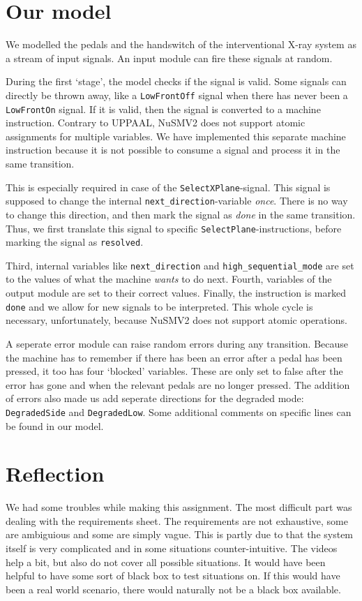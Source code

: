 \documentclass[a4paper,10pt]{article}
\begin{document}
	\section{Our model}
	We modelled the pedals and the handswitch of the interventional X-ray system as a stream of input signals.
	An input module can fire these signals at random.
	
	During the first `stage', the model checks if the signal is valid.
	Some signals can directly be thrown away, like a \texttt{LowFrontOff} signal when there has never been a \texttt{LowFrontOn} signal.
	If it is valid, then the signal is converted to a machine instruction.
	Contrary to UPPAAL, NuSMV2 does not support atomic assignments for multiple variables.
	We have implemented this separate machine instruction because it is not possible to consume a signal and process it in the same transition.
	
	This is especially required in case of the \texttt{SelectXPlane}-signal.
	This signal is supposed to change the internal \texttt{next\_direction}-variable \emph{once}.
	There is no way to change this direction, and then mark the signal as \emph{done} in the same transition.
	Thus, we first translate this signal to specific \texttt{SelectPlane}-instructions, before marking the signal as \texttt{resolved}.

	Third, internal variables like \texttt{next\_direction} and \texttt{high\_sequential\_mode} are set to the values of what the machine \emph{wants} to do next.
	Fourth, variables of the output module are set to their correct values.
	Finally, the instruction is marked \texttt{done} and we allow for new signals to be interpreted.
	This whole cycle is necessary, unfortunately, because NuSMV2 does not support atomic operations.
	
	A seperate error module can raise random errors during any transition.
	Because the machine has to remember if there has been an error after a pedal has been pressed, it too has four `blocked' variables.
	These are only set to false after the error has gone and when the relevant pedals are no longer pressed.
	The addition of errors also made us add seperate directions for the degraded mode: \texttt{DegradedSide} and \texttt{DegradedLow}.
	Some additional comments on specific lines can be found in our model.

	\section{Reflection}
	We had some troubles while making this assignment.
	The most difficult part was dealing with the requirements sheet.
	The requirements are not exhaustive, some are ambiguious and some are simply vague.
	This is partly due to that the system itself is very complicated and in some situations counter-intuitive.
	The videos help a bit, but also do not cover all possible situations.
	It would have been helpful to have some sort of black box to test situations on.
	If this would have been a real world scenario, there would naturally not be a black box available.
	
\end{document}
